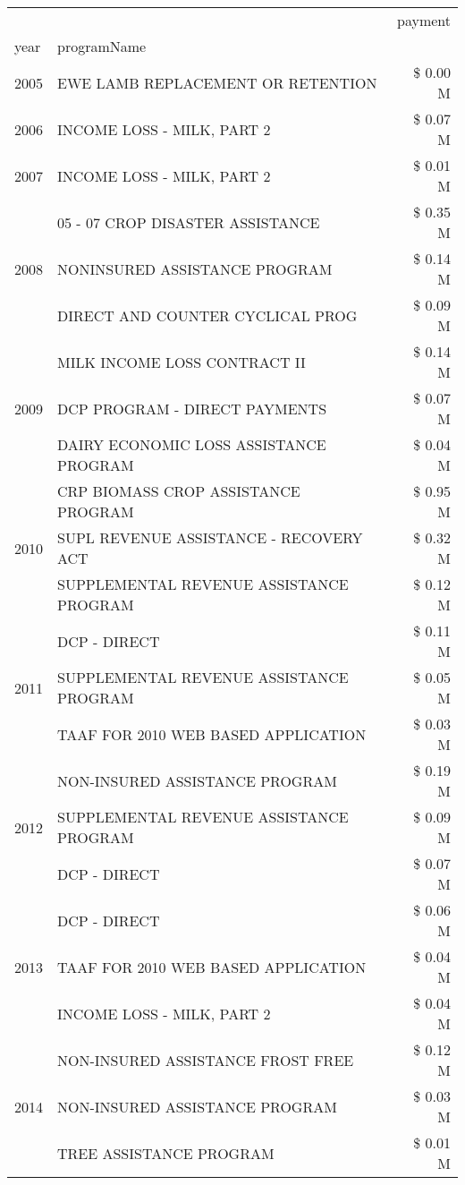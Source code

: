 \begin{tabular}{llr}
\toprule
 &  & payment \\
year & programName &  \\
\midrule
2005 & EWE LAMB REPLACEMENT OR RETENTION & \$ 0.00 M \\
\cline{1-3}
2006 & INCOME LOSS - MILK, PART 2 & \$ 0.07 M \\
\cline{1-3}
2007 & INCOME LOSS - MILK, PART 2 & \$ 0.01 M \\
\cline{1-3}
\multirow[t]{3}{*}{2008} & 05 - 07 CROP DISASTER ASSISTANCE & \$ 0.35 M \\
 & NONINSURED ASSISTANCE PROGRAM & \$ 0.14 M \\
 & DIRECT AND COUNTER CYCLICAL PROG & \$ 0.09 M \\
\cline{1-3}
\multirow[t]{3}{*}{2009} & MILK INCOME LOSS CONTRACT II & \$ 0.14 M \\
 & DCP PROGRAM - DIRECT PAYMENTS & \$ 0.07 M \\
 & DAIRY ECONOMIC LOSS ASSISTANCE PROGRAM & \$ 0.04 M \\
\cline{1-3}
\multirow[t]{3}{*}{2010} & CRP BIOMASS CROP ASSISTANCE PROGRAM & \$ 0.95 M \\
 & SUPL REVENUE ASSISTANCE - RECOVERY ACT & \$ 0.32 M \\
 & SUPPLEMENTAL REVENUE ASSISTANCE PROGRAM & \$ 0.12 M \\
\cline{1-3}
\multirow[t]{3}{*}{2011} & DCP - DIRECT & \$ 0.11 M \\
 & SUPPLEMENTAL REVENUE ASSISTANCE PROGRAM & \$ 0.05 M \\
 & TAAF FOR 2010 WEB BASED APPLICATION & \$ 0.03 M \\
\cline{1-3}
\multirow[t]{3}{*}{2012} & NON-INSURED ASSISTANCE PROGRAM & \$ 0.19 M \\
 & SUPPLEMENTAL REVENUE ASSISTANCE PROGRAM & \$ 0.09 M \\
 & DCP - DIRECT & \$ 0.07 M \\
\cline{1-3}
\multirow[t]{3}{*}{2013} & DCP - DIRECT & \$ 0.06 M \\
 & TAAF FOR 2010 WEB BASED APPLICATION & \$ 0.04 M \\
 & INCOME LOSS - MILK, PART 2 & \$ 0.04 M \\
\cline{1-3}
\multirow[t]{3}{*}{2014} & NON-INSURED ASSISTANCE FROST FREE & \$ 0.12 M \\
 & NON-INSURED ASSISTANCE PROGRAM & \$ 0.03 M \\
 & TREE ASSISTANCE PROGRAM & \$ 0.01 M \\

\end{tabular}
